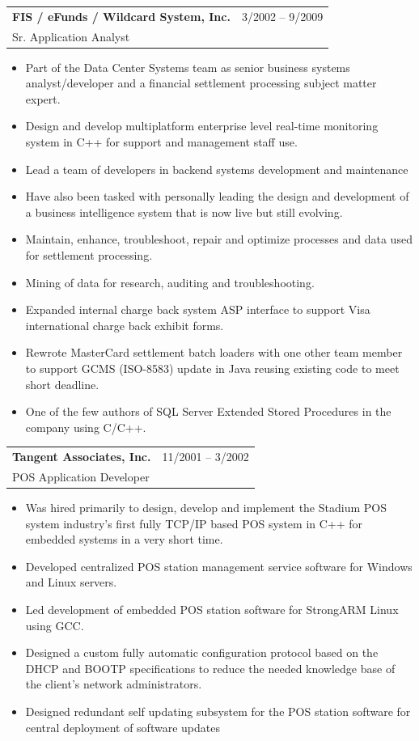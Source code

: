 \documentclass[10pt]{report}
\begin{document}
\noindent
\begin{tabular}{ L{.5\textwidth}  R{.4\textwidth} }
\textbf{\large FIS / eFunds / Wildcard System, Inc.} & 3/2002 -- 9/2009 \\
Sr. Application Analyst &
\end{tabular}

\begin{itemize}
\item Part of the Data Center Systems team as senior business systems analyst/developer and a financial settlement processing subject matter expert.  
\item Design and develop multiplatform enterprise level real-time monitoring system in C++ for support and management staff use. 
\item Lead a team of developers in backend systems development and maintenance
\item Have also been tasked with personally leading the design and development of a business intelligence system that is now live but still evolving.
\item Maintain, enhance, troubleshoot, repair and optimize processes and data used for settlement processing.
\item Mining of data for research, auditing and troubleshooting.
\item Expanded internal charge back system ASP interface to support Visa international charge back exhibit forms.
\item Rewrote MasterCard settlement batch loaders with one other team member to support GCMS (ISO-8583) update in Java reusing existing code to meet short deadline.
\item One of the few authors of SQL Server Extended Stored Procedures in the company using C/C++.
\end{itemize}
\bigskip

\noindent
\begin{tabular}{ L{.5\textwidth}  R{.4\textwidth} }
\textbf{\large Tangent Associates, Inc.} & 11/2001 -- 3/2002 \\
POS Application Developer
\end{tabular}

\begin{itemize}
\item Was hired primarily to design, develop and implement the Stadium POS system industry’s first fully TCP/IP based POS system in C++ for embedded systems in a very short time.
\item Developed centralized POS station management service software for Windows and Linux servers.
\item Led development of embedded POS station software for StrongARM Linux using GCC.
\item Designed a custom fully automatic configuration protocol based on the DHCP and BOOTP specifications to reduce the needed knowledge base of the client’s network administrators.
\item Designed redundant self updating subsystem for the POS station software for central deployment of software updates
\end{itemize}
\bigskip
\end{document}
